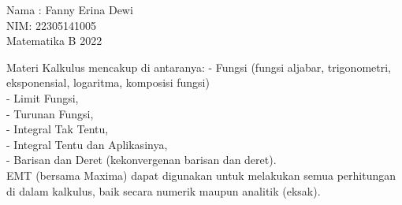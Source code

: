 \documentclass[a4paper,10pt]{article}
\begin{document}
\begin{eulernotebook}
\eulersubheading{}
\begin{eulercomment}
Nama : Fanny Erina Dewi\\
NIM: 22305141005\\
Matematika B 2022\\
\end{eulercomment}
\eulersubheading{}
\begin{eulercomment}
\begin{eulercomment}
\begin{eulercomment}
Materi Kalkulus mencakup di antaranya: - Fungsi (fungsi aljabar,
trigonometri, eksponensial, logaritma, komposisi fungsi)\\
- Limit Fungsi,\\
- Turunan Fungsi,\\
- Integral Tak Tentu,\\
- Integral Tentu dan Aplikasinya,\\
- Barisan dan Deret (kekonvergenan barisan dan deret).\\
EMT (bersama Maxima) dapat digunakan untuk melakukan semua perhitungan
di dalam kalkulus, baik secara numerik maupun analitik (eksak).


\end{eulercomment}
\end{eulercomment}
\end{eulercomment}
\end{eulernotebook}
\end{document}
